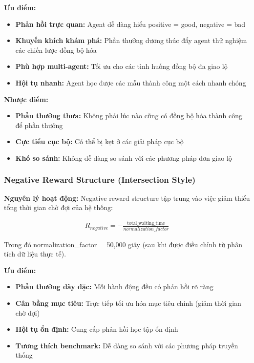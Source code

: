 \textbf{Ưu điểm:}
\begin{itemize}
    \item \textbf{Phản hồi trực quan:} Agent dễ dàng hiểu positive = good, negative
        = bad

    \item \textbf{Khuyến khích khám phá:} Phần thưởng dương thúc đẩy agent thử
        nghiệm các chiến lược đồng bộ hóa

    \item \textbf{Phù hợp multi-agent:} Tối ưu cho các tình huống đồng bộ đa giao lộ

    \item \textbf{Hội tụ nhanh:} Agent học được các mẫu thành công một
        cách nhanh chóng
\end{itemize}

\textbf{Nhược điểm:}
\begin{itemize}
    \item \textbf{Phần thưởng thưa:} Không phải lúc nào cũng có đồng bộ hóa thành công để phần thưởng

    \item \textbf{Cực tiểu cục bộ:} Có thể bị kẹt ở các giải pháp cục bộ

    \item \textbf{Khó so sánh:} Không dễ dàng so sánh với các phương pháp đơn giao lộ
\end{itemize}

\subsubsection{Negative Reward Structure (Intersection Style)}

\textbf{Nguyên lý hoạt động:} Negative reward structure tập trung vào việc giảm
thiểu tổng thời gian chờ đợi của hệ thống:

\begin{align}
    R_{negative}= -\frac{\text{total\_waiting\_time}}{normalization\_factor}
\end{align}

Trong đó normalization\_factor = 50,000 giây (sau khi được điều chỉnh từ phân
tích dữ liệu thực tế).

\textbf{Ưu điểm:}
\begin{itemize}
    \item \textbf{Phần thưởng dày đặc:} Mỗi hành động đều có phản hồi rõ ràng

    \item \textbf{Cân bằng mục tiêu:} Trực tiếp tối ưu hóa mục tiêu chính (giảm
        thời gian chờ đợi)

    \item \textbf{Hội tụ ổn định:} Cung cấp phản hồi học tập ổn định

    \item \textbf{Tương thích benchmark:} Dễ dàng so sánh với các phương pháp
        truyền thống
\end{itemize}

